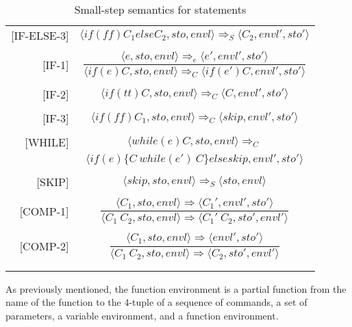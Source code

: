 \begin{longtable}[c] { r c }
  [IF-ELSE-3] & \( 
    \langle if (ff) C_1 else C_2, sto, envl \rangle \Rightarrow_S \langle C_2, envl', sto' \rangle \) \\
  & \\

  [IF-1] & \( 
    \dfrac { \langle e, sto, envl \rangle \Rightarrow_e \langle e', envl', sto' \rangle }
      { \langle if (e) C, sto, envl \rangle \Rightarrow_C \langle if (e') C, envl', sto' \rangle } \) \\
  & \\

  [IF-2] & \( 
    \langle if (tt) C, sto, envl \rangle \Rightarrow_C \langle C, envl', sto' \rangle \) \\
  & \\

  [IF-3] & \( 
    \langle if (ff) C_1, sto, envl \rangle \Rightarrow_C \langle skip, envl', sto' \rangle \) \\
  & \\

  [WHILE] & \( 
    \langle while (e) C, sto, envl \rangle \Rightarrow_C \) \\
  & \(\langle if (e) \{C\ while (e')\ C\} else skip, envl', sto' \rangle \) \\
  & \\

  [SKIP] & \( 
    \langle skip, sto, envl \rangle \Rightarrow_S \langle sto, envl \rangle \) \\
  & \\


  [COMP-1] & \( 
    \dfrac{ \langle C_1, sto, envl \rangle \Rightarrow \langle C_1', envl', sto' \rangle}
      { \langle C_1\ C_2, sto, envl \rangle \Rightarrow \langle C_1'\ C_2, sto', envl' \rangle} \) \\
  & \\

  [COMP-2] & \( 
    \dfrac{ \langle C_1, sto, envl \rangle \Rightarrow \langle envl', sto' \rangle}
      { \langle C_1\ C_2, sto, envl \rangle \Rightarrow \langle C_2, sto', envl' \rangle} \) \\
  & \\

  \caption{Small-step semantics for statements}
\end{longtable}
        


As previously mentioned, the function environment is a partial function from the name of the function to the 4-tuple of a sequence of commands, a set of parameters, a variable environment, and a function environment.

